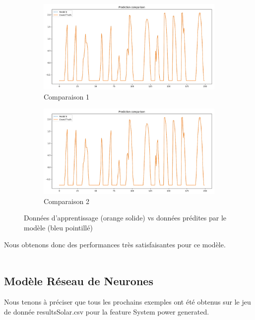 \documentclass{article}
\begin{document}
    \begin{figure}
        \centering
        \begin{subfigure}{.5\textwidth}
          \centering
          \includegraphics[scale=0.25]{ResultsSolar/comparison_test_0.png}
          \caption{Comparaison 1}
          \label{fig:sub1}
        \end{subfigure}%
        \begin{subfigure}{.5\textwidth}
          \centering
          \includegraphics[scale=0.25]{ResultsSolar/comparison_test_0.png}
          \caption{Comparaison 2}
          \label{fig:sub2}
        \end{subfigure}
        \caption{Données d'apprentissage (orange solide) vs données prédites par le modèle (bleu pointillé)}
        \label{fig:test}
    \end{figure}
    Nous obtenons donc des performances très satisfaisantes pour ce modèle.
    \\\\\subsection{Modèle Réseau de Neurones}
    Nous tenons à préciser que tous les prochains exemples ont été obtenus sur le jeu de donnée resultsSolar.csv pour la feature System power generated.
    
\end{document}
